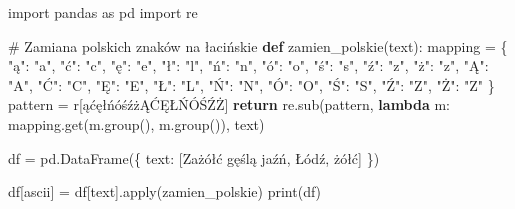 \documentclass[
  polish,
  letterpaper,
  DIV=11,
  numbers=noendperiod]{scrreprt}
\newenvironment{Shaded}{\begin{snugshade}}{\end{snugshade}}
\newcommand{\BuiltInTok}[1]{\textcolor[rgb]{0.00,0.23,0.31}{#1}}
\newcommand{\CommentTok}[1]{\textcolor[rgb]{0.37,0.37,0.37}{#1}}
\newcommand{\ControlFlowTok}[1]{\textcolor[rgb]{0.00,0.23,0.31}{\textbf{#1}}}
\newcommand{\ImportTok}[1]{\textcolor[rgb]{0.00,0.46,0.62}{#1}}
\newcommand{\KeywordTok}[1]{\textcolor[rgb]{0.00,0.23,0.31}{\textbf{#1}}}
\newcommand{\NormalTok}[1]{\textcolor[rgb]{0.00,0.23,0.31}{#1}}
\newcommand{\OperatorTok}[1]{\textcolor[rgb]{0.37,0.37,0.37}{#1}}
\newcommand{\PreprocessorTok}[1]{\textcolor[rgb]{0.68,0.00,0.00}{#1}}
\newcommand{\StringTok}[1]{\textcolor[rgb]{0.13,0.47,0.30}{#1}}
\newcommand{\VerbatimStringTok}[1]{\textcolor[rgb]{0.13,0.47,0.30}{#1}}
\begin{document}
\begin{Shaded}
\begin{Highlighting}[]
\ImportTok{import}\NormalTok{ pandas }\ImportTok{as}\NormalTok{ pd}
\ImportTok{import}\NormalTok{ re}

\CommentTok{\# Zamiana polskich znaków na łacińskie}
\KeywordTok{def}\NormalTok{ zamien\_polskie(text):}
\NormalTok{    mapping }\OperatorTok{=}\NormalTok{ \{}
        \StringTok{"ą"}\NormalTok{: }\StringTok{"a"}\NormalTok{, }\StringTok{"ć"}\NormalTok{: }\StringTok{"c"}\NormalTok{, }\StringTok{"ę"}\NormalTok{: }\StringTok{"e"}\NormalTok{, }\StringTok{"ł"}\NormalTok{: }\StringTok{"l"}\NormalTok{, }\StringTok{"ń"}\NormalTok{: }\StringTok{"n"}\NormalTok{,}
        \StringTok{"ó"}\NormalTok{: }\StringTok{"o"}\NormalTok{, }\StringTok{"ś"}\NormalTok{: }\StringTok{"s"}\NormalTok{, }\StringTok{"ź"}\NormalTok{: }\StringTok{"z"}\NormalTok{, }\StringTok{"ż"}\NormalTok{: }\StringTok{"z"}\NormalTok{,}
        \StringTok{"Ą"}\NormalTok{: }\StringTok{"A"}\NormalTok{, }\StringTok{"Ć"}\NormalTok{: }\StringTok{"C"}\NormalTok{, }\StringTok{"Ę"}\NormalTok{: }\StringTok{"E"}\NormalTok{, }\StringTok{"Ł"}\NormalTok{: }\StringTok{"L"}\NormalTok{, }\StringTok{"Ń"}\NormalTok{: }\StringTok{"N"}\NormalTok{,}
        \StringTok{"Ó"}\NormalTok{: }\StringTok{"O"}\NormalTok{, }\StringTok{"Ś"}\NormalTok{: }\StringTok{"S"}\NormalTok{, }\StringTok{"Ź"}\NormalTok{: }\StringTok{"Z"}\NormalTok{, }\StringTok{"Ż"}\NormalTok{: }\StringTok{"Z"}
\NormalTok{    \}}
\NormalTok{    pattern }\OperatorTok{=} \VerbatimStringTok{r\textquotesingle{}}\PreprocessorTok{[ąćęłńóśźżĄĆĘŁŃÓŚŹŻ]}\VerbatimStringTok{\textquotesingle{}}
    \ControlFlowTok{return}\NormalTok{ re.sub(pattern, }\KeywordTok{lambda}\NormalTok{ m: mapping.get(m.group(), m.group()), text)}

\NormalTok{df }\OperatorTok{=}\NormalTok{ pd.DataFrame(\{}
    \StringTok{\textquotesingle{}text\textquotesingle{}}\NormalTok{: [}\StringTok{\textquotesingle{}Zażółć gęślą jaźń\textquotesingle{}}\NormalTok{, }\StringTok{\textquotesingle{}Łódź\textquotesingle{}}\NormalTok{, }\StringTok{\textquotesingle{}żółć\textquotesingle{}}\NormalTok{]}
\NormalTok{\})}

\NormalTok{df[}\StringTok{\textquotesingle{}ascii\textquotesingle{}}\NormalTok{] }\OperatorTok{=}\NormalTok{ df[}\StringTok{\textquotesingle{}text\textquotesingle{}}\NormalTok{].}\BuiltInTok{apply}\NormalTok{(zamien\_polskie)}
\BuiltInTok{print}\NormalTok{(df)}
\end{Highlighting}
\end{Shaded}
\end{document}

